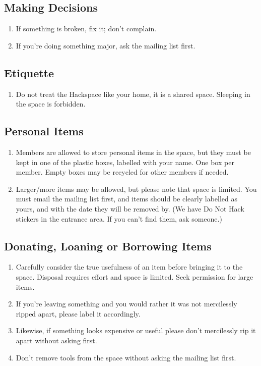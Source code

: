 \documentclass[11pt,a5paper,twoside]{memoir}
\begin{document}
\subsection{Making Decisions}

\begin{enumerate}
	\item If something is broken, fix it; don't complain.
	\item If you're doing something major, ask the mailing list first.
\end{enumerate}

\subsection{Etiquette}

\begin{enumerate}
	\item Do not treat the Hackspace like your home, it is a shared space. Sleeping in the space is forbidden.
\end{enumerate}

\subsection{Personal Items}

\begin{enumerate}
	\item Members are allowed to store personal items in the space, but they must be kept in one of the plastic boxes, labelled with your name. One box per member. Empty boxes may be recycled for other members if needed.
	\item Larger/more items may be allowed, but please note that space is limited. You must email the mailing list first, and items should be clearly labelled as yours, and with the date they will be removed by. (We have Do Not Hack stickers in the entrance area. If you can't find them, ask someone.)
\end{enumerate}

\subsection{Donating, Loaning or Borrowing Items}

\begin{enumerate}
	\item Carefully consider the true usefulness of an item before bringing it to the space. Disposal requires effort and space is limited. Seek permission for large items.
	\item If you're leaving something and you would rather it was not mercilessly ripped apart, please label it accordingly.
	\item Likewise, if something looks expensive or useful please don't mercilessly rip it apart without asking first.
	\item Don't remove tools from the space without asking the mailing list first.
\end{enumerate}
\end{document}
